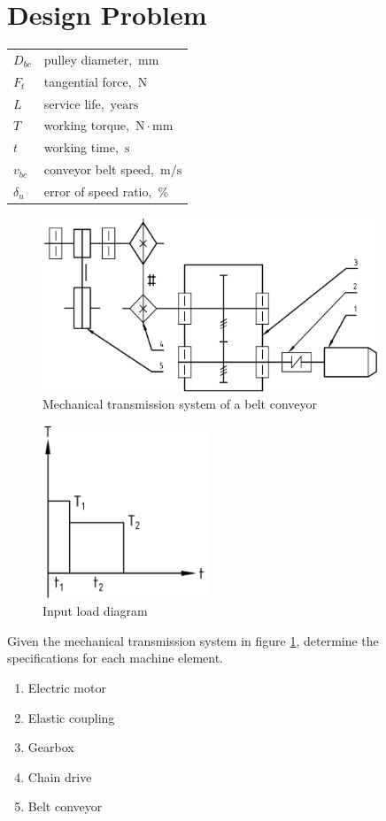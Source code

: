 \documentclass[12pt,a5paper,graybox,envcountchap,sectrefs]{svmono}
\newcommand{\unit}[1]{\ensuremath{\, \mathrm{#1}}}
\begin{document}
		\tableofcontents
		\listoftables
		\listoffigures
		\chapter*{Design Problem}
		\begin{tabular}[ht]{ll}
			$ D_{bc} $ & pulley diameter, $ \unit{mm} $\\
			$ F_t $ & tangential force, $ \unit{N} $\\			
			$ L $ & service life, $ \unit{years} $\\
			$ T $ & working torque, $ \unit{N \cdot mm} $\\
			$ t $ & working time, $ \unit{s} $\\
			$ v_{bc} $ & conveyor belt speed, $ \unit{m/s} $\\
			$ \delta_u $ & error of speed ratio, $ \unit{\%} $
		\end{tabular}
		\begin{figure}[ht]
			\centering
			\includegraphics[width=100mm]{system.png}
			\caption{Mechanical transmission system of a belt conveyor}
			\label{system diagram}
		\end{figure}
	
		\begin{figure}[ht]
			\sidecaption
			\includegraphics[width=50mm]{load.png}
			\caption{Input load diagram}
			\label{load diagram}
		\end{figure}
		Given the mechanical transmission system in figure \ref{system diagram}, determine the specifications for each machine element.
		\begin{enumerate}
			\item Electric motor
			\item Elastic coupling
			\item Gearbox
			\item Chain drive
			\item Belt conveyor
		\end{enumerate}
	
\end{document}
